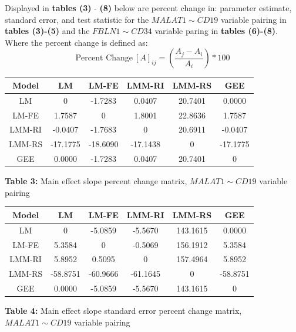 \documentclass[12pt,]{article}
\begin{document}
Displayed in \textbf{tables (3)} - \textbf{(8)} below are percent change
in: parameter estimate, standard error, and test statistic for the
\(MALAT1 \sim CD19\) variable pairing in \textbf{tables (3)-(5)} and the
\(FBLN1 \sim CD34\) variable paring in \textbf{tables (6)-(8)}. Where
the percent change is defined as:
\[\text{Percent Change} \ [A]_{ij} = \left(\frac{A_{j}-A_{i}}{A_{i}}\right) * 100\]

\begin{center}
\begin{tabular}{|c||c|c|c|c|c|}
\hline
Model & LM & LM-FE & LMM-RI & LMM-RS & GEE \\
\hline
\hline
LM     & 0  & -1.7283 & 0.0407 & \cellcolor{red!25} 20.7401 & \cellcolor{green!25} 0.0000 \\
\hline
LM-FE  & 1.7587 & 0 &  \cellcolor{orange!25} 1.8001 & \cellcolor{red!25} 22.8636 & 1.7587 \\  
\hline
LMM-RI & -0.0407 & \cellcolor{orange!25} -1.7683 & 0  & \cellcolor{red!25}20.6911 & -0.0407 \\
\hline
LMM-RS & \cellcolor{blue!25} -17.1775 & \cellcolor{blue!25} -18.6090 & \cellcolor{blue!25} -17.1438 & 0 & \cellcolor{blue!25} -17.1775 \\
\hline
GEE    & \cellcolor{green!25} 0.0000 & -1.7283 & 0.0407 & \cellcolor{red!25}20.7401 & 0 \\
\hline
\end{tabular}

\vspace{5pt}

\textbf{Table 3:} Main effect slope percent change matrix, $MALAT1 \sim CD19$ variable pairing
\end{center}

\vspace{20pt}

\begin{center}
\begin{tabular}{|c||c|c|c|c|c|}
\hline
Model & LM & LM-FE & LMM-RI & LMM-RS & GEE \\
\hline
\hline
LM     & 0  & -5.0859 & -5.5670 & \cellcolor{red!25} 143.1615 & \cellcolor{green!25} 0.0000 \\
\hline
LM-FE  & 5.3584 &  0 &  \cellcolor{orange!25} -0.5069 & \cellcolor{red!25} 156.1912 & 5.3584 \\  
\hline
LMM-RI & 5.8952 & \cellcolor{orange!25} 0.5095 & 0 & \cellcolor{red!25} 157.4964 & 5.8952 \\
\hline
LMM-RS & \cellcolor{blue!25} -58.8751 & \cellcolor{blue!25} -60.9666 & \cellcolor{blue!25} -61.1645 & 0 & \cellcolor{blue!25} -58.8751 \\
\hline
GEE   & \cellcolor{green!25} 0.0000 & -5.0859 & -5.5670 & \cellcolor{red!25}143.1615 & 0 \\
\hline
\end{tabular}

\vspace{5pt}

\textbf{Table 4:} Main effect slope standard error percent change matrix, $MALAT1 \sim CD19$ variable pairing
\end{center}
\end{document}
